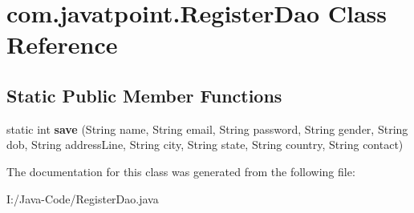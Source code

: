 \hypertarget{classcom_1_1javatpoint_1_1_register_dao}{}\section{com.\+javatpoint.\+Register\+Dao Class Reference}
\label{classcom_1_1javatpoint_1_1_register_dao}
\subsection*{Static Public Member Functions}
\begin{DoxyCompactItemize}
\item 
\mbox{\label{classcom_1_1javatpoint_1_1_register_dao_a64556a1e61a54d6f9df71e9c8d7bc3f6}} 
static int {\bfseries save} (String name, String email, String password, String gender, String dob, String address\+Line, String city, String state, String country, String contact)
\end{DoxyCompactItemize}


The documentation for this class was generated from the following file\+:\begin{DoxyCompactItemize}
\item 
I\+:/\+Java-\/\+Code/Register\+Dao.\+java\end{DoxyCompactItemize}
